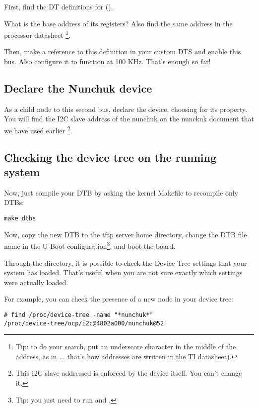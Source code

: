 First, find the DT definitions for ().

What is the base address of its registers? Also find the same address in
the processor datasheet \footnote{Tip: to do your search, put an
underscore character in the middle of the address, as in
... that's how addresses are written in the
TI datasheet).}.

Then, make a reference to this definition in your custom DTS and
enable this bus. Also configure it to function at 100 KHz. That's
enough so far!

\subsection{Declare the Nunchuk device}

As a child node to this second bus, declare the 
device, choosing  for its 
property. You will find the I2C slave address of the nunchuk on the
nunckuk document that we have used earlier \footnote{This I2C slave
addressed is enforced by the device itself. You can't change it.}.

\subsection{Checking the device tree on the running system}

Now, just compile your DTB by asking the kernel Makefile to recompile
only DTBs:

\begin{verbatim}
make dtbs
\end{verbatim}

Now, copy the new DTB to the tftp server home directory, change the DTB
file name in the U-Boot configuration\footnote{Tip: you just need to run
 and .}, and boot the board.

Through the  directory, it is possible to check
the Device Tree settings that your system has loaded. That's useful when
you are not sure exactly which settings were actually loaded.

For example, you can check the presence of a new  node in
your device tree:

\begin{verbatim}
# find /proc/device-tree -name "*nunchuk*"
/proc/device-tree/ocp/i2c@4802a000/nunchuk@52
\end{verbatim}

